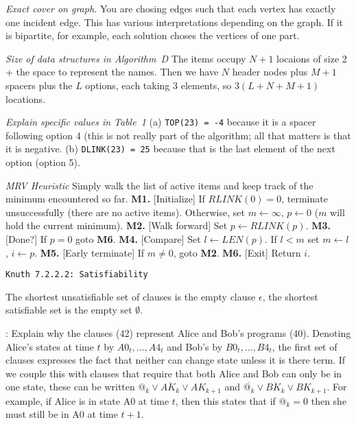 {\it Exact cover on graph.}\hfil\break
You are chosing edges such that each vertex has exactly one incident edge.
This has various interpretations depending on the graph.  If it is bipartite, for
example, each solution choses the vertices of one part.

 {\it Size of data structures in Algorithm~D}\hfil\break
The items occupy $N+1$ locaions of size 2 + the space to represent the names.
Then we have $N$ header nodes plus $M+1$ spacers plus the $L$ options,
each taking 3 elements, so $3\left(L + N + M + 1\right)$ locations.

 {\it Explain specific values in Table~1}\hfil\break
(a) {\tt TOP(23) = -4} because it is a spacer following option 4 (this is not
really part of the algorithm; all that matters is that it is negative.\hfil\break
(b) {\tt DLINK(23) = 25} because that is the last element of the next option
(option 5).

 {\it MRV Heuristic}\hfil\break
Simply walk the list of active items and keep track of the minimum encountered
so far.\hfil\break
{\bf M1.} [Initialize] If $RLINK\left(0\right) = 0$, terminate unsuccessfully (there are no
 active items).  Otherwise, set $m \leftarrow \infty$, $p \leftarrow 0$ ($m$ will hold
 the current minimum).\hfil\break
{\bf M2.} [Walk forward] Set $p \leftarrow RLINK\left(p\right)$.\hfil\break
{\bf M3.} [Done?] If $p = 0$ goto {\bf M6}.\hfil\break
{\bf M4.} [Compare] Set $l \leftarrow LEN\left(p\right)$.  If $l < m$ set $m \leftarrow l$,
 $i \leftarrow p$.\hfil\break
{\bf M5.} [Early terminate] If $m \ne 0$, goto {\bf M2}.\hfil\break
{\bf M6.} [Exit] Return $i$.\hfil\break

\topglue 0.5in
\centerline{\tt Knuth 7.2.2.2: Satisfiability}
\vskip 0.3in

 The shortest unsatisfiable set of clauses is the
empty clause $\epsilon$, the shortest satisfiable set is the empty set $\emptyset$.

: Explain why the clauses (42) represent Alice and Bob's
programs (40).\hfil\break
Denoting Alice's states at time $t$ by $A0_t, \ldots, A4_t$ and Bob's by $B0_t, \ldots, B4_t$,
the first set of clauses expresses the fact that neither can change state unless it is there term.
If we couple this with clauses that require that both Alice and Bob can only be in one
state, these can be written $@_k \vee \overline{AK_{k}} \vee AK_{k+1}$
and $\overline{@_k} \vee \overline{BK_{k}} \vee BK_{k+1}$.  For example, if Alice is in state
A0 at time $t$, then this states that if $@_k = 0$ then she must still be in A0 at
time $t+1$.

